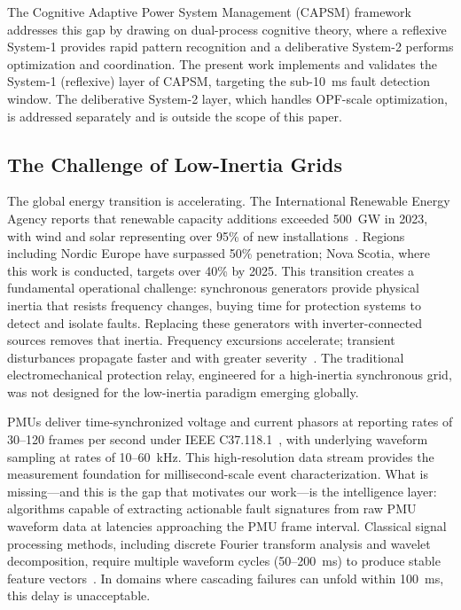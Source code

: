 \documentclass[journal]{IEEEtran}
\begin{document}
The Cognitive Adaptive Power System Management (CAPSM) framework~\cite{ref15} addresses this gap by drawing on dual-process cognitive theory, where a reflexive System-1 provides rapid pattern recognition and a deliberative System-2 performs optimization and coordination. The present work implements and validates the System-1 (reflexive) layer of CAPSM, targeting the sub-10~ms fault detection window. The deliberative System-2 layer, which handles OPF-scale optimization, is addressed separately and is outside the scope of this paper.

\subsection{The Challenge of Low-Inertia Grids}

The global energy transition is accelerating. The International Renewable Energy Agency reports that renewable capacity additions exceeded 500~GW in 2023, with wind and solar representing over 95\% of new installations~\cite{ref1}. Regions including Nordic Europe have surpassed 50\% penetration; Nova Scotia, where this work is conducted, targets over 40\% by 2025. This transition creates a fundamental operational challenge: synchronous generators provide physical inertia that resists frequency changes, buying time for protection systems to detect and isolate faults. Replacing these generators with inverter-connected sources removes that inertia. Frequency excursions accelerate; transient disturbances propagate faster and with greater severity~\cite{ref2}. The traditional electromechanical protection relay, engineered for a high-inertia synchronous grid, was not designed for the low-inertia paradigm emerging globally.

PMUs deliver time-synchronized voltage and current phasors at reporting rates of 30--120 frames per second under IEEE C37.118.1~\cite{ref4}, with underlying waveform sampling at rates of 10--60~kHz. This high-resolution data stream provides the measurement foundation for millisecond-scale event characterization. What is missing---and this is the gap that motivates our work---is the intelligence layer: algorithms capable of extracting actionable fault signatures from raw PMU waveform data at latencies approaching the PMU frame interval. Classical signal processing methods, including discrete Fourier transform analysis and wavelet decomposition, require multiple waveform cycles (50--200~ms) to produce stable feature vectors~\cite{ref5}. In domains where cascading failures can unfold within 100~ms, this delay is unacceptable.
\end{document}
